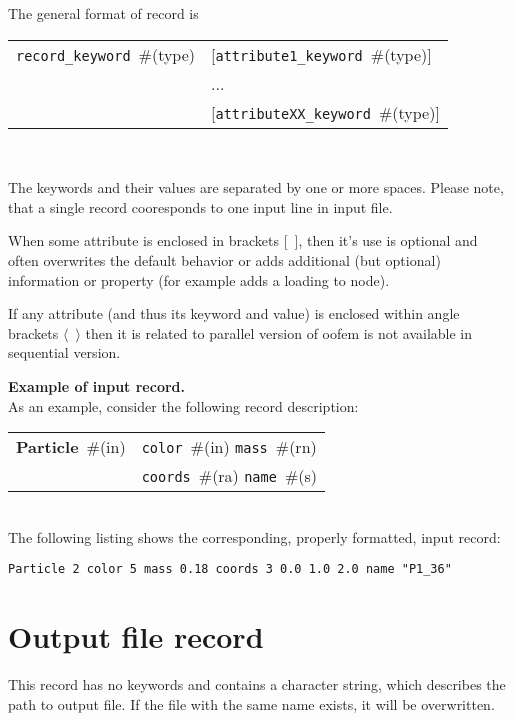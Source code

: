 \documentclass[a4paper]{article}
\newcommand{\param}[1]{\texttt{#1}} %
\newcommand{\optional}[1]{[#1]} %
\newcommand{\field}[2]{\param{#1}~\#{\tiny(#2)}} %
\newcommand{\optField}[2]{\optional{\field{#1}{#2}}}
\newcommand{\entKeywordInstWithVal}[2]{\textbf{#1}~\#{\tiny(#2)}} %
\newcommand{\Pmode}[1]{{\sffamily #1}}
\newenvironment{record}[1][]{\begin{tabular}{|ll}}{\end{tabular}\\}
\newcommand{\recentry}[2]{{#1}&{#2}\\}
\newcounter{rcc}
\newenvironment{record}[1][\textwidth]{\setcounter{rcc}{0}\rowcolors{1}{lightgray}{lightgray}\tabularx{#1}{llR} \hline}
               {\endtabularx}
\newcommand{\recentry}[2]{\ifthenelse{\value{rcc}>0}{$\backslash$ \\}{\setcounter{rcc}{1}}{#1}&{#2}&}
\begin{document}
The general format of record is \\

\noindent
\begin{record}
  \recentry{\field{record\_keyword}{type}}{\optField{attribute1\_keyword}{type}}
  \recentry{}{...}
  \recentry{}{\optField{attributeXX\_keyword}{type}}
\end{record}

The keywords and their values are separated by one or more spaces. Please note, that a single record cooresponds to one input line in input file. 


When some attribute is enclosed in brackets [~], then it's use is optional
and often overwrites the default behavior or adds additional (but
optional) information or property (for example adds a loading to
node).

\Pmode{If any attribute (and thus its keyword and value) is enclosed within angle brackets $\langle$~$\rangle$ then it is related to parallel version of oofem is not available in sequential version.}

{\flushleft \bf Example of input record.}\\
As an example, consider the following record description:\\
\begin{record}
  \recentry{\entKeywordInstWithVal{Particle}{in}}{\field{color}{in} \field{mass}{rn}}
  \recentry{}{\field{coords}{ra} \field{name}{s}}
\end{record}
The following listing shows the corresponding, properly formatted, input record:
\begin{lstlisting}[style=oofem, language=oofeminput, caption={Corresponding input record}, moreemph={color, mass, name}, morekeywords={Particle}]
Particle 2 color 5 mass 0.18 coords 3 0.0 1.0 2.0 name "P1_36"
\end{lstlisting}



\section{Output file record}
\label{_OutputFileRecord}
This record has no keywords and contains a character string, which
describes the path to output file. If the file with the same name exists,
it will be overwritten.
\end{document}
